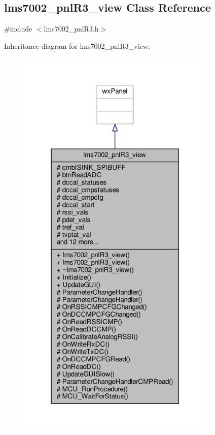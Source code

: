 \subsection{lms7002\+\_\+pnl\+R3\+\_\+view Class Reference}
\label{classlms7002__pnlR3__view}


{\ttfamily \#include $<$lms7002\+\_\+pnl\+R3.\+h$>$}



Inheritance diagram for lms7002\+\_\+pnl\+R3\+\_\+view\+:
\nopagebreak
\begin{figure}[H]
\begin{center}
\leavevmode
\includegraphics[height=550pt]{d4/d5d/classlms7002__pnlR3__view__inherit__graph}
\end{center}
\end{figure}


